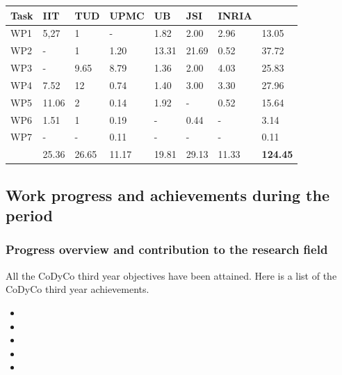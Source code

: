 \documentclass[12pt,a4paper,twoside]{article}
\begin{document}
\begin{longtable}{|C{1.5cm}|C{1.5cm}|C{1.5cm}|C{1.5cm}|C{1.5cm}|C{1.5cm}|C{1.5cm}|C{1.5cm}|}
\footnotesize \textbf{Task}& \footnotesize \textbf{IIT}&\footnotesize \textbf{TUD}&\footnotesize \textbf{UPMC}& \footnotesize \textbf{UB} &\footnotesize \textbf{JSI} &\footnotesize \textbf{INRIA} &  \\ \hline
\footnotesize WP1      &  5,27     &  1      &  -      &  1.82   &  2.00  &  2.96  &  13.05\\  \hline
\footnotesize WP2      &  -        &  1      &  1.20   &  13.31  &  21.69 &  0.52  &  37.72\\  \hline
\footnotesize WP3      &  -        &  9.65   &  8.79   &  1.36   &  2.00  &  4.03  &  25.83\\  \hline
\footnotesize WP4      &  7.52     &  12     &  0.74   &  1.40   &  3.00  &  3.30  &  27.96\\  \hline
\footnotesize WP5      &  11.06    &  2      &  0.14   &  1.92   &  -     &  0.52  &  15.64\\  \hline
\footnotesize WP6      &  1.51     &  1      &  0.19   &  -      &  0.44  &  -     &   3.14\\  \hline
\footnotesize WP7      &  -        &  -      &  0.11   &  -      &  -     &  -     &   0.11\\  \hline
{}  &  25.36    &  26.65  &  11.17  &  19.81  &  29.13 &  11.33 &  \textbf{124.45}     \\  
\end{longtable}










\subsection{Work progress and achievements during the period}

\subsubsection{Progress overview and contribution to the research field}

All the CoDyCo third year objectives have been attained. Here is a list of the CoDyCo third year
achievements. \begin{itemize}

\item 

\item 

\item 

\item 

\item 

\end{itemize}
\end{document}
